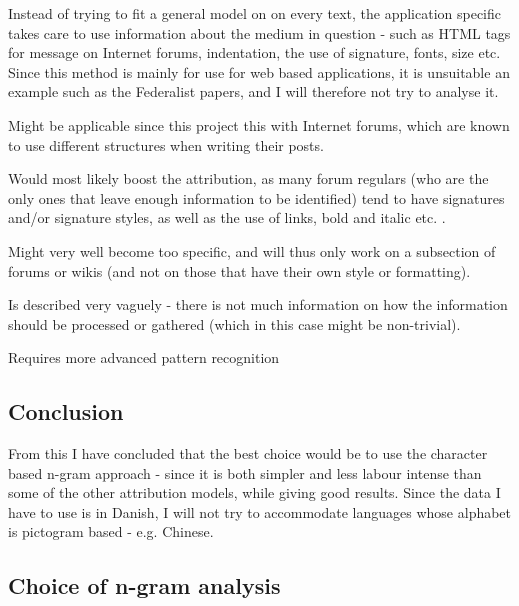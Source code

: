{\label{application}
Instead of trying to fit a general model on on every text, the application specific takes care to use information about the medium in question - such as HTML tags for message on Internet forums, indentation, the use of signature, fonts, size etc.
}
{
Since this method is mainly for use for web based applications, it is unsuitable an example such as the Federalist papers, and I will therefore not try to analyse it. 
}
{
\item Might be applicable since this project this with Internet forums, which are known to use different structures when writing their posts.
\item Would most likely boost the attribution, as many forum regulars (who are the only ones that leave enough information to be identified) tend to have signatures and/or signature styles, as well as the use of links, bold and italic etc. .
}{
\item Might very well become too specific, and will thus only work on a subsection of forums or wikis (and not on those that have their own style or formatting).
\item Is described very vaguely - there is not much information on how the information should be processed or gathered (which in this case might be non-trivial).
\item Requires more advanced pattern recognition 
}

\subsection{Conclusion}
\label{technique:conclusion}
From this I have concluded that the best choice would be to use the character based n-gram approach - since it is both simpler and less labour intense than some of the other attribution models, while giving good results. Since the data I have to use is in Danish, I will not try to accommodate languages whose alphabet is pictogram based - e.g. Chinese.


\subsection{Choice of n-gram analysis}

